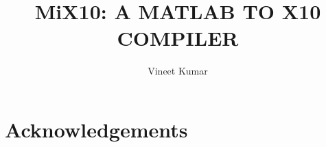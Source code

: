 \documentclass[MSc,twoside,openright]{Thesis}
\title{MiX10: A MATLAB TO X10 COMPILER}
\author{Vineet Kumar}
\newif\ifdraft
\begin{document}
\pagestyle{empty}



\maketitle
\cleardoublepage


\preface %

\begin{Abstract}

\end{Abstract}

\begin{Resume}

\end{Resume}

\chapter*{Acknowledgements}



\renewcommand{\contentsname}{Table of Contents}%
\addto\captionsenglish{%
  \renewcommand{\contentsname}%
    {Table of Contents}%
}
\addto\captionsenglish{%
  \renewcommand{\lstlistlistingname}%
    {List of Listings}%
}

\tableofcontents
\listoffigures
\listoftables
\renewcommand{\lstlistlistingname}{List of Listings}
\cleardoublepage

\maintext %

\pagestyle{fancyplain}


%
%
%
%
\end{document}
